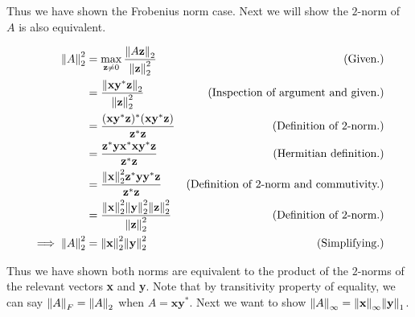 \begin{solution}
    Thus we have shown the Frobenius norm case. Next we will show the $2$-norm of $A$ is also equivalent. 

    \alignbreak
    \begin{align}
        \norm{A}_2^2 &= \max_{\textbf{z} \neq 0}\frac{\norm{A\textbf{z}}_2}{\norm{\textbf{z}}_2^2} &\text{(Given.)}\nonumber\\ 
        &= \frac{\norm{\textbf{xy}^*\textbf{z}}_2}{\norm{\textbf{z}}_2^2} &\text{(Inspection of argument and given.)}\nonumber\\ 
        &= \frac{(\textbf{xy}^*\textbf{z})^*(\textbf{xy}^*\textbf{z})}{\textbf{z}^*\textbf{z}} &\text{(Definition of $2$-norm.)}\nonumber\\
        &= \frac{\textbf{z}^*\textbf{y}\textbf{x}^*\textbf{x}\textbf{y}^* \textbf{z}}{\textbf{z}^*\textbf{z}} &\text{(Hermitian definition.)}\nonumber\\
        &= \frac{\norm{\textbf{x}}^2_2\textbf{z}^*\textbf{y}\textbf{y}^*\textbf{z}}{\textbf{z}^*\textbf{z}} &\text{(Definition of $2$-norm and commutivity.)}\nonumber\\
        &= \frac{\norm{\textbf{x}}^2_2\norm{\textbf{y}}^2_2\norm{\textbf{z}}^2_2}{\norm{\textbf{z}}_2^2} &\text{(Definition of $2$-norm.)}\nonumber\\
       \implies \norm{A}_2^2  &= \norm{\textbf{x}}_2^2\norm{\textbf{y}}_2^2 &\text{(Simplifying.)}\nonumber
    \end{align}
    \alignbreak

    Thus we have shown both norms are equivalent to the product of the $2$-norms of the relevant vectors \textbf{x}  and \textbf{y}. Note that by transitivity property of equality, we can say $\norm{A}_F = \norm{A}_2$ when $A = \textbf{x}\textbf{y}^*$. Next we want to show $\norm{A}_\infty = \norm{\textbf{x}}_\infty \norm{\textbf{y}}_1$. 


\end{solution}
